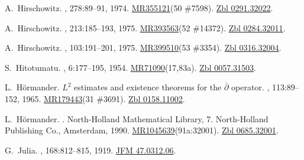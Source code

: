 \documentclass[11pt,a4paper, final, twoside]{article}
\numberwithin{equation}{section}
\begin{document}
\begin{appendices}
\begin{thebibliography}{100}
A.~Hirschowitz.
, 278:89--91, 1974.
\newblock \href{http://www.ams.org/mathscinet-getitem?mr=355121}{MR355121}(50
  \#7598). \href{http://zbmath.org/?q=an:0291.32022}{Zbl 0291.32022}.

A.~Hirschowitz.
, 213:185--193, 1975.
\newblock \href{http://www.ams.org/mathscinet-getitem?mr=393563}{MR393563}(52
  \#14372). \href{http://zbmath.org/?q=an:0284.32011}{Zbl 0284.32011}.

A.~Hirschowitz.
,
  103:191--201, 1975.
\newblock \href{http://www.ams.org/mathscinet-getitem?mr=399510}{MR399510}(53
  \#3354). \href{http://zbmath.org/?q=an:0316.32004}{Zbl 0316.32004}.

S.~Hitotumatu.
, 6:177--195,
  1954.
\newblock
  \href{http://www.ams.org/mathscinet-getitem?mr=71090}{MR71090}(17,83a).
  \href{http://zbmath.org/?q=an:0057.31503}{Zbl 0057.31503}.

L.~H\"ormander.
\newblock ${L}^2$ estimates and existence theorems for the $\overline\partial$
  operator.
, 113:89--152, 1965.
\newblock \href{http://www.ams.org/mathscinet-getitem?mr=179443}{MR179443}(31
  \#3691). \href{http://zbmath.org/?q=an:0158.11002}{Zbl 0158.11002}.

L.~H{\"o}rmander.
.
\newblock North-Holland Mathematical Library, 7. North-Holland Publishing Co.,
  Amsterdam, 1990.
\newblock
  \href{http://www.ams.org/mathscinet-getitem?mr=1045639}{MR1045639}(91a:32001).
  \href{http://zbmath.org/?q=an:0685.32001}{Zbl 0685.32001}.

G.~Julia.
, 168:812--815, 1919.
\newblock \href{http://zbmath.org/?q=an:47.0312.06}{JFM 47.0312.06}.


\end{thebibliography}
\end{appendices}
\end{document}
